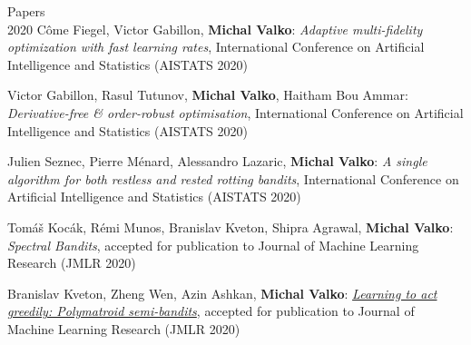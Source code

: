 \documentclass{resume}
\begin{document}
\begin{category}{Papers\\2020}
\citembullet
C\^ome Fiegel, Victor Gabillon, {\bf Michal Valko}:
\emph{Adaptive multi-fidelity optimization with fast learning rates},
International Conference on Artificial Intelligence and Statistics
({\sf AISTATS 2020}) 

\citembullet
Victor Gabillon, Rasul Tutunov, {\bf Michal Valko}, Haitham Bou Ammar:
\emph{Derivative-free \& order-robust optimisation},
International Conference on Artificial Intelligence and Statistics
({\sf AISTATS 2020}) 

\citembullet
Julien Seznec, Pierre M\'enard, Alessandro Lazaric, {\bf Michal Valko}:
\emph{A single algorithm for both restless and rested rotting bandits},
International Conference on Artificial Intelligence and Statistics
({\sf AISTATS 2020}) 

\citembullet
Tom\'a\v s Koc\' ak,  R\' emi Munos, Branislav Kveton, Shipra Agrawal, {\bf Michal Valko}:
\emph{Spectral Bandits},
accepted for publication to Journal of Machine Learning Research
({\sf JMLR 2020}) 

\citembullet
Branislav Kveton, Zheng Wen, Azin Ashkan, {\bf Michal Valko}:
\href{https://arxiv.org/pdf/1405.7752.pdf}
{\emph{Learning to act greedily: Polymatroid semi-bandits}},
accepted for publication to Journal of Machine Learning Research
({\sf JMLR 2020}) 
\end{category}
\end{document}
